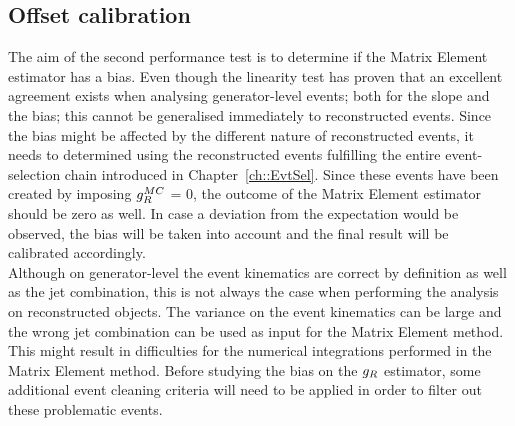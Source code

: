\subsection{Offset calibration} \label{subsec::CutValue}

The aim of the second performance test is to determine if the Matrix Element estimator has a bias.
Even though the linearity test has proven that an excellent agreement exists when analysing generator-level events; both for the slope and the bias; this cannot be generalised immediately to reconstructed events.
Since the bias might be affected by the different nature of reconstructed events, it needs to determined using the reconstructed events fulfilling the entire event-selection chain introduced in Chapter~\ref{ch::EvtSel}.
Since these events have been created by imposing $g_{R}^{MC}$ = 0, the outcome of the Matrix Element estimator should be zero as well.
In case a deviation from the expectation would be observed, the bias will be taken into account and the final result will be calibrated accordingly. 
\\

Although on generator-level the event kinematics are correct by definition as well as the jet combination, this is not always the case when performing the analysis on reconstructed objects. The variance on the event kinematics can be large and the wrong jet combination can be used as input for the Matrix Element method. This might result in difficulties for the numerical integrations performed in the Matrix Element method. Before studying the bias on the $g_{R}$ estimator, some additional event cleaning criteria will need to be applied in order to filter out these problematic events.

